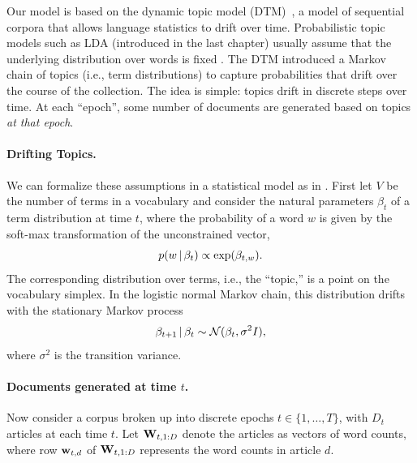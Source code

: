 Our model is based on the dynamic topic model (DTM)~\citep{blei:2006},
a model of sequential corpora that allows language statistics to drift
over time.  Probabilistic topic models such as LDA (introduced in the
last chapter) usually assume that the underlying distribution over
words is fixed \citep{blei:2003,deerwester:1990,hofmann:1999}. The DTM
introduced a Markov chain of topics (i.e., term distributions) to capture
probabilities that drift over the course of the collection.  The idea
is simple: topics drift in discrete steps over time.  At each
``epoch'', some number of documents are generated based on topics
\emph{at that epoch}.

\paragraph{Drifting Topics.} We can formalize these assumptions in a
statistical model as in \cite{blei:2006}.  First let
$V$ be the number of terms in a vocabulary and consider the natural
parameters $\beta_t$ of a term distribution at time $t$, where the
probability of a word $w$ is given by the soft-max transformation of
the unconstrained vector,
\begin{equation}
  \label{eq:softmax}
  p(w \, | \, \beta_{t}) \propto \exp(\beta_{t,w}).
\end{equation}
The corresponding distribution over terms, i.e., the ``topic,'' is a
point on the vocabulary simplex.  In the logistic normal Markov chain,
this distribution drifts with the stationary Markov process
\begin{equation}
  \label{eq:logistic-normal}
  \beta_{t+1} \, | \, \beta_t \sim \mathcal{N}(\beta_{t}, \sigma^2 I),
\end{equation}
where $\sigma^2$ is the transition variance. 

\paragraph{Documents generated at time $t$.} Now consider a corpus
broken up into discrete epochs $t \in \{ 1, \ldots, T \}$, with $D_t$
articles at each time $t$.  Let $\textbf{W}_{t,1:D}$ denote the articles as
vectors of word counts, where row $\textbf{w}_{t,d}$ of $\textbf{W}_{t, 1:D}$
represents the word counts in article $d$.

